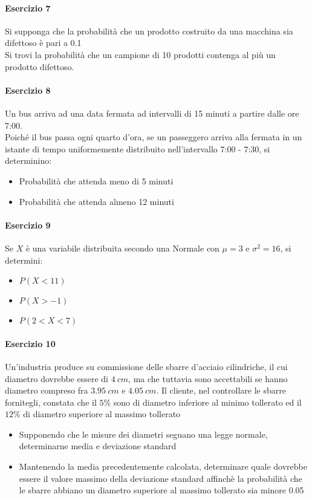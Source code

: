 \documentclass[12pt]{article}
\begin{document}
    \paragraph{Esercizio 7}
    Si supponga che la probabilità che un prodotto costruito da una macchina sia difettoso è pari a 0.1
    \\Si trovi la probabilità che un campione di 10 prodotti contenga al più un prodotto difettoso.
    \paragraph{Esercizio 8}
    Un bus arriva ad una data fermata ad intervalli di 15 minuti a partire dalle ore 7:00.
    \\Poiché il bus passa ogni quarto d’ora, se un passeggero arriva alla fermata in un istante di tempo uniformemente distribuito nell’intervallo 7:00 - 7:30, si determinino:
    \begin{itemize}
        \item Probabilità che attenda meno di 5 minuti
        \item Probabilità che attenda almeno 12 minuti
    \end{itemize}
    \paragraph{Esercizio 9}
    Se $X$ è una variabile distribuita secondo una Normale con $\mu = 3$ e $\sigma^2= 16$, si determini:
    \begin{itemize}
        \item $P( X < 11 )$
        \item $P( X > -1 )$
        \item $P( 2 < X < 7 )$
    \end{itemize}
    \paragraph{Esercizio 10}
    Un’industria produce su commissione delle sbarre d’acciaio cilindriche, il cui diametro dovrebbe essere di $4 \ cm$, ma che tuttavia sono accettabili se hanno diametro compreso fra $3.95 \ cm$ e $4.05 \ cm$. Il cliente, nel controllare le sbarre fornitegli, constata che il $5\%$ sono di diametro inferiore al minimo tollerato ed il $12\%$ di diametro superiore al massimo tollerato
    \begin{itemize}
        \item Supponendo che le misure dei diametri seguano una legge normale, determinarne media e deviazione standard
        \item Mantenendo la media precedentemente calcolata, determinare quale dovrebbe essere il valore massimo della deviazione standard affinchè la probabilità che le sbarre abbiano un diametro superiore al massimo tollerato sia minore 0.05        
    \end{itemize}
    \newpage
\end{document}
